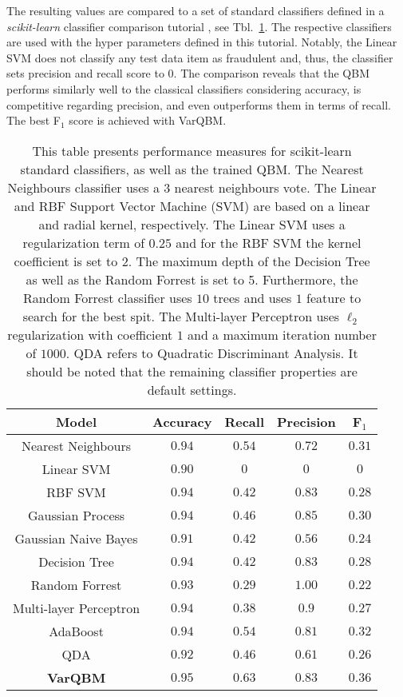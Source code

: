 \documentclass[twocolumn, aps, pra, superscriptaddress, floatfix]{revtex4}
\newcommand{\varqbm}{VarQBM}
\begin{document}
The resulting values are compared to a set of standard classifiers defined in a \emph{scikit-learn} \cite{scikit-learn2011} classifier comparison tutorial \cite{scikitClassifierComp}, see Tbl.~\ref{tbl:measuresQBM}. The respective classifiers are used with the hyper parameters defined in this tutorial.
Notably, the Linear SVM does not classify any test data item as fraudulent and, thus, the classifier sets precision and recall score to $0$.
The comparison reveals that the QBM performs similarly well to the classical classifiers considering accuracy, is competitive regarding precision, and even outperforms them in terms of recall. The best F$_1$ score is achieved with \varqbm.

\begin{table}[h!]
\captionsetup{singlelinecheck = false, format= hang, justification=raggedright, font=footnotesize, labelsep=space}
{\renewcommand{\arraystretch}{1.2}
\begin{tabular}{c | c | c | c | c}
Model & Accuracy & Recall & Precision & F$_1$\\
\hline
Nearest Neighbours & $0.94$ &  $0.54$ & $0.72$ & $0.31$ \\
Linear SVM & $0.90 $& $0$ & $0$ & $0$ \\
RBF SVM & $0.94 $& $0.42$ & $0.83$ & $0.28$  \\
Gaussian Process & $0.94$ & $0.46$ & $0.85$ & $0.30$\\
Gaussian Naive Bayes  & $0.91$ &$ 0.42 $& $0.56$ & $0.24$\\
Decision Tree & $0.94$ & $0.42$ & $0.83$ & $0.28$\\
Random Forrest & $0.93 $& $0.29$ & $1.00$ & $0.22$\\
Multi-layer Perceptron  & $0.94$ &  $0.38$ &$0.9$ & $0.27$\\
AdaBoost & $0.94$ & $0.54$ & $0.81$ & $0.32$\\
QDA & $0.92$ & $0.46$ & $0.61$ & $0.26$\\
\textbf{\varqbm} & $\mathbf{0.95}$ & 
$\mathbf{0.63}$ & $\mathbf{0.83}$ & $\mathbf{0.36}$\\
\end{tabular}
}
\caption{This table presents performance measures for scikit-learn standard classifiers, as well as the trained QBM. The Nearest Neighbours classifier uses a $3$ nearest neighbours vote. The Linear and RBF Support Vector Machine (SVM) are based on a linear and radial kernel, respectively. The Linear SVM uses a regularization term of $0.25$ and for the RBF SVM the kernel coefficient is set to $2$. The maximum depth of the Decision Tree as well as the Random Forrest is set to 5. Furthermore, the Random Forrest classifier uses $10$ trees and uses $1$ feature to search for the best spit. The Multi-layer Perceptron uses $\ell_2$ regularization with coefficient $1$ and a maximum iteration number of $1000$. QDA refers to Quadratic Discriminant Analysis. It should be noted that the remaining classifier properties are default settings.}
\label{tbl:measuresQBM}
\end{table}
\end{document}
